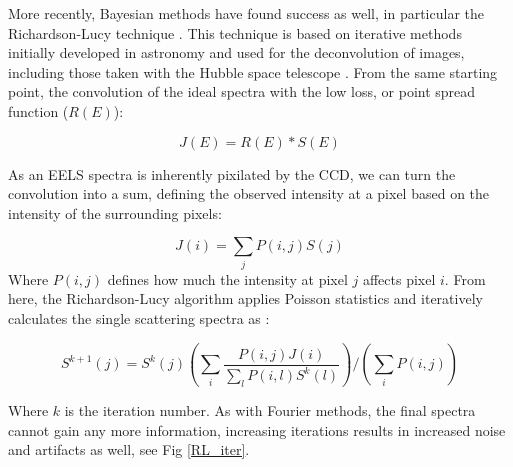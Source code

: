 More recently, Bayesian methods have found success as well, in particular the Richardson-Lucy technique \cite{richardson_lucy}. This technique is based on iterative methods initially developed in astronomy and used for the deconvolution of images, including those taken with the Hubble space telescope \cite{hubble}.  From the same starting point, the convolution of the ideal spectra with the low loss, or point spread function ($R(E)$):

\begin{equation}
J(E) = R(E)\ast S(E)
\end{equation}

As an EELS spectra is inherently pixilated by the CCD, we can turn the convolution into a sum, defining the observed intensity at a pixel based on the intensity of the surrounding pixels: 

\begin{equation}
	J(i) = \sum_{j} P(i,j) S(j)
\end{equation}
Where $P(i,j)$ defines how much the intensity at pixel $j$ affects pixel $i$.  
From here, the Richardson-Lucy algorithm applies Poisson statistics and iteratively calculates the single scattering spectra as  \cite{richardson_lucy}:  

\begin{equation}
S^{k+1}(j) = S^k(j) \left(\sum_{i} \frac{P(i,j)J(i)}{\sum_{l}P(i,l)S^k(l)}\right) \bigg/ \left( \sum_{i} P(i,j)\right)
\end{equation}

Where $k$ is the iteration number.  As with Fourier methods, the final spectra cannot gain any more information, increasing iterations results in increased noise and artifacts as well, see Fig \ref{RL_iter}.

